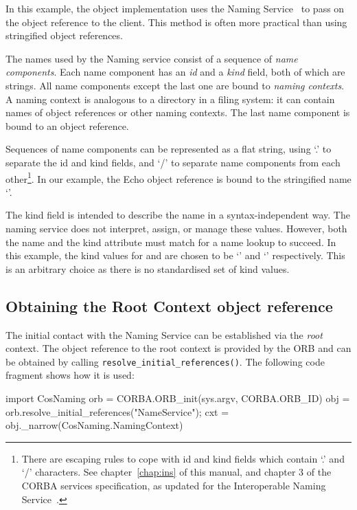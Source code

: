 \documentclass[11pt,oneside,a4paper]{book}
\newcommand{\op}[1]{\texttt{#1()}}
\newcommand{\term}[1]{\textit{#1}}
\begin{document}
In this example, the object implementation uses the Naming
Service~\cite{corbaservices} to pass on the object reference to the
client.  This method is often more practical than using stringified
object references.

The names used by the Naming service consist of a sequence of
\term{name components}. Each name component has an \term{id} and a
\term{kind} field, both of which are strings. All name components
except the last one are bound to \term{naming contexts}. A naming
context is analogous to a directory in a filing system: it can contain
names of object references or other naming contexts. The last name
component is bound to an object reference.

Sequences of name components can be represented as a flat string,
using `.' to separate the id and kind fields, and `/' to separate name
components from each other\footnote{There are escaping rules to cope
with id and kind fields which contain `.' and `/' characters. See
chapter~\ref{chap:ins} of this manual, and chapter 3 of the CORBA
services specification, as updated for the Interoperable Naming
Service~\cite{inschapters}.}. In our example, the Echo object
reference is bound to the stringified name
`'.

The kind field is intended to describe the name in a
syntax-independent way. The naming service does not interpret, assign,
or manage these values. However, both the name and the kind attribute
must match for a name lookup to succeed. In this example, the kind
values for  and  are chosen to be
`' and `' respectively. This is an
arbitrary choice as there is no standardised set of kind values.


\subsection{Obtaining the Root Context object reference}
\label{resolveinit}

The initial contact with the Naming Service can be established via the
\term{root} context. The object reference to the root context is
provided by the ORB and can be obtained by calling
\op{resolve\_initial\_references}. The following code fragment shows
how it is used:

\begin{pylisting}
import CosNaming
orb = CORBA.ORB_init(sys.argv, CORBA.ORB_ID)
obj = orb.resolve_initial_references("NameService");
cxt = obj._narrow(CosNaming.NamingContext)
\end{pylisting}
\end{document}
